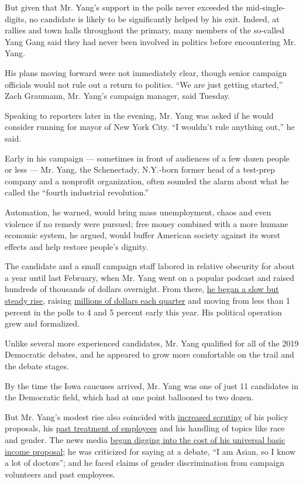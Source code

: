 But given that Mr. Yang's support in the polls never exceeded the
mid-single-digits, no candidate is likely to be significantly helped by
his exit. Indeed, at rallies and town halls throughout the primary, many
members of the so-called Yang Gang said they had never been involved in
politics before encountering Mr. Yang.

His plans moving forward were not immediately clear, though senior
campaign officials would not rule out a return to politics. ``We are
just getting started,'' Zach Graumann, Mr. Yang's campaign manager, said
Tuesday.

Speaking to reporters later in the evening, Mr. Yang was asked if he
would consider running for mayor of New York City. ``I wouldn't rule
anything out,'' he said.

Early in his campaign --- sometimes in front of audiences of a few dozen
people or less --- Mr. Yang, the Schenectady, N.Y.-born former head of a
test-prep company and a nonprofit organization, often sounded the alarm
about what he called the ``fourth industrial revolution.''

Automation, he warned, would bring mass unemployment, chaos and even
violence if no remedy were pursued; free money combined with a more
humane economic system, he argued, would buffer American society against
its worst effects and help restore people's dignity.

The candidate and a small campaign staff labored in relative obscurity
for about a year until last February, when Mr. Yang went on a popular
podcast and raised hundreds of thousands of dollars overnight. From
there,
\href{https://www.nytimes.com/2019/11/11/us/politics/andrew-yang-campaign.html}{he
began a slow but steady rise}, raising
\href{https://www.nytimes.com/2020/01/02/us/politics/andrew-yang-fundraising.html}{millions
of dollars each quarter} and moving from less than 1 percent in the
polls to 4 and 5 percent early this year. His political operation grew
and formalized.

Unlike several more experienced candidates, Mr. Yang qualified for all
of the 2019 Democratic debates, and he appeared to grow more comfortable
on the trail and the debate stages.

By the time the Iowa caucuses arrived, Mr. Yang was one of just 11
candidates in the Democratic field, which had at one point ballooned to
two dozen.

But Mr. Yang's modest rise also coincided with
\href{https://www.nytimes.com/2020/02/07/us/politics/andrew-yang-president-campaign.html}{increased
scrutiny} of his policy proposals, his
\href{https://www.buzzfeednews.com/article/mollyhensleyclancy/a-woman-claimed-andrew-yang-discriminated-against-her-at}{past
treatment of employees} and his handling of topics like race and gender.
The news media
\href{https://www.politico.com/magazine/story/2019/10/16/andrew-yang-universal-basic-income-229847}{began
digging into the cost of his universal basic income proposal}; he was
criticized for saying at a debate, ``I am Asian, so I know a lot of
doctors''; and he faced claims of gender discrimination from campaign
volunteers and past employees.


